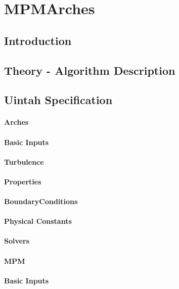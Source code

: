 
\section{MPMArches}

\subsection{Introduction}

\subsection{Theory - Algorithm Description}

\subsection{Uintah Specification}

\paragraph{Arches}

\paragraph{Basic Inputs}
\paragraph{Turbulence}
\paragraph{Properties}
\paragraph{BoundaryConditions}
\paragraph{Physical Constants}
\paragraph{Solvers}


\paragraph{MPM}

\paragraph{Basic Inputs}
